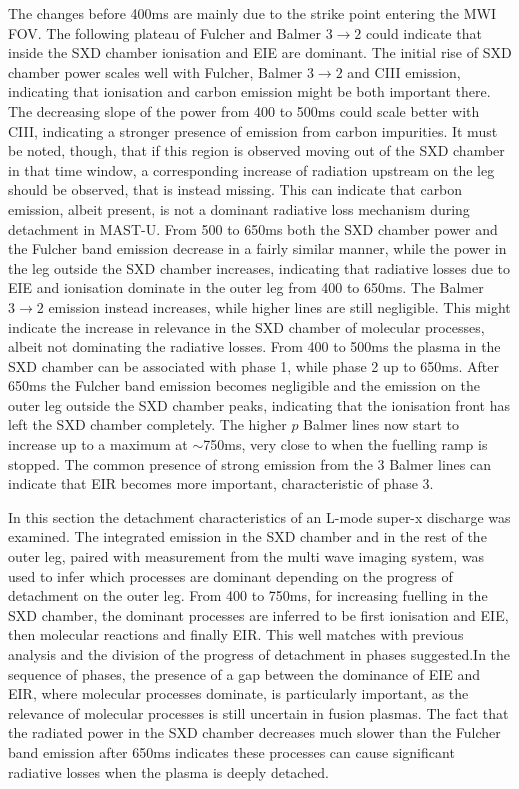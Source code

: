 The changes before 400ms are mainly due to the strike point entering the MWI FOV. The following plateau of Fulcher and Balmer $3 \rightarrow 2$ could indicate that inside the SXD chamber ionisation and EIE are dominant. The initial rise of SXD chamber power scales well with Fulcher, Balmer $3 \rightarrow 2$ and CIII emission, indicating that ionisation and carbon emission might be both important there. The decreasing slope of the power from 400 to 500ms could scale better with CIII, indicating a stronger presence of emission from carbon impurities. It must be noted, though, that if this region is observed moving out of the SXD chamber in that time window, a corresponding increase of radiation upstream on the leg should be observed, that is instead missing. This can indicate that carbon emission, albeit present, is not a dominant radiative loss mechanism during detachment in MAST-U. From 500 to 650ms both the SXD chamber power and the Fulcher band emission decrease in a fairly similar manner, while the power in the leg outside the SXD chamber increases, indicating that radiative losses due to EIE and ionisation dominate in the outer leg from 400 to 650ms. The Balmer $3 \rightarrow 2$ emission instead increases, while higher lines are still negligible. This might indicate the increase in relevance in the SXD chamber of molecular processes, albeit not dominating the radiative losses. From 400 to 500ms the plasma in the SXD chamber can be associated with phase 1, while phase 2 up to 650ms. After 650ms the Fulcher band emission becomes negligible and the emission on the outer leg outside the SXD chamber peaks, indicating that the ionisation front has left the SXD chamber completely. The higher $p$ Balmer lines now start to increase up to a maximum at $\sim$750ms, very close to when the fuelling ramp is stopped. The common presence of strong emission from the 3 Balmer lines can indicate that EIR becomes more important, characteristic of phase 3.%

In this section the detachment characteristics of an L-mode super-x discharge was examined. The integrated emission in the SXD chamber and in the rest of the outer leg, paired with measurement from the multi wave imaging system, was used to infer which processes are dominant depending on the progress of detachment on the outer leg. From 400 to 750ms, for increasing fuelling in the SXD chamber, the dominant processes are inferred to be first ionisation and EIE, then molecular reactions and finally EIR. This well matches with previous analysis\cite{Verhaegh2022} and the division of the progress of detachment in phases suggested.In the sequence of phases, the presence of a gap between the dominance of EIE and EIR, where molecular processes dominate, is particularly important, as the relevance of molecular processes is still uncertain in fusion plasmas. The fact that the radiated power in the SXD chamber decreases much slower than the Fulcher band emission after 650ms indicates these processes can cause significant radiative losses when the plasma is deeply detached.



